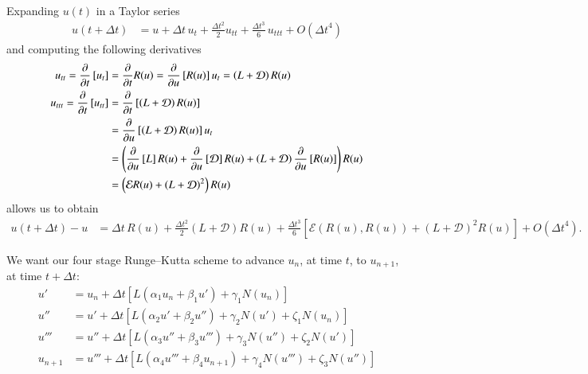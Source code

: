 \documentclass[letterpaper,11pt]{amsart}
\newcommand{\order}[2]{\ensuremath{O\!\left( {#1}^{#2} \right)}}
\begin{document}
Expanding $u(t)$ in a Taylor series
\begin{align}
  u\left( t+\Delta{}t \right)
  &=
  u
  +
  \Delta{}t\,u_{t}
  +
  \frac{\Delta{}t^{2}}{2}u_{tt}
  +
  \frac{\Delta{}t^{3}}{6}\,u_{ttt}
  +
  \order{\Delta{}t}{4}
\end{align}
and computing the following derivatives
\begin{subequations}
\begin{align}
  u_{tt}
  =
  \frac{\partial}{\partial{}t}
  \left[u_{t}\right]
  &=
  \frac{\partial}{\partial{}t} R(u)
  =
  \frac{\partial}{\partial{}u} \left[ R(u) \right]
  u_{t}
  =
  \left( L + \mathcal{D} \right) R(u)
\\
  u_{ttt}
  =
  \frac{\partial}{\partial{}t}
  \left[u_{tt}\right]
  &=
  \frac{\partial}{\partial{}t}
  \left[
    \left( L + \mathcal{D} \right) R(u)
  \right]
\\
\notag
  &=
  \frac{\partial}{\partial{}u}
  \left[
    \left( L + \mathcal{D} \right) R(u)
  \right]
  u_{t}
\\
\notag
  &=
  \left(
  \frac{\partial}{\partial{}u}
  \left[ L \right] R(u)
  +
  \frac{\partial}{\partial{}u}
  \left[ \mathcal{D} \right] R(u)
  +
  \left(L + \mathcal{D}\right)
  \frac{\partial}{\partial{}u}
  \left[ R(u) \right]
  \right)
  R(u)
\\
\notag
  &=
  \left(
  \mathcal{E} R(u)
  +
  \left(L + \mathcal{D}\right)^{2}
  \right)
  R(u)
\end{align}
\end{subequations}
allows us to obtain
\begin{align}
  u\left( t+\Delta{}t \right) - u
  &=
  \Delta{}t\,R(u)
  +
  \frac{\Delta{}t^{2}}{2}
  \left( L + \mathcal{D} \right) R(u)
  +
  \frac{\Delta{}t^{3}}{6}
  \left[
    \mathcal{E}\left( R(u), R(u) \right)
    +
    \left(L + \mathcal{D}\right)^{2} R(u)
  \right]
  +
  \order{\Delta{}t}{4}
  .
\end{align}

We want our four stage Runge--Kutta scheme to advance
$u_{n}$, at time $t$, to $u_{n+1}$, at time $t+\Delta{}t$:
\begin{subequations}
\begin{align}
  u'
  &=
  u_{n}
  + \Delta{}t\left[
      L\left( \alpha_{1}u_{n} + \beta_{1}u' \right)
    + \gamma_{1} N(u_{n})
  \right]
\\
  u''
  &=
  u'
  + \Delta{}t\left[
    L\left( \alpha_{2}u' + \beta_{2}u'' \right)
    + \gamma_{2} N(u') + \zeta_{1} N(u_{n})
  \right]
\\
  u'''
  &=
  u''
  + \Delta{}t\left[
      L\left( \alpha_{3}u'' + \beta_{3}u''' \right)
    + \gamma_{3} N(u'') + \zeta_{2} N(u')
  \right]
\\
  u_{n+1}
  &=
  u'''
  + \Delta{}t\left[
      L\left( \alpha_{4}u''' + \beta_{4}u_{n+1} \right)
    + \gamma_{4} N(u''') + \zeta_{3} N(u'')
  \right]
\end{align}
\end{subequations}
\end{document}
